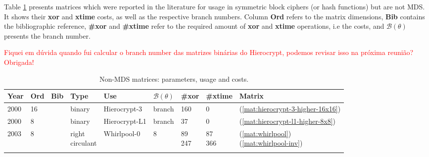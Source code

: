 Table \ref{tbl:non-mds-list} presents matrices which were reported in the literature for usage in symmetric block ciphers (or hash functions) but are not MDS. It shows their \textbf{xor} and \textbf{xtime} costs, as well as the respective branch numbers. Column \textbf{Ord} refers to the matrix dimensions, \textbf{Bib} contains the bibliographic reference, \textbf{\#xor} and \textbf{\#xtime} refer to the required amount of \textbf{xor} and \textbf{xtime} operations, i.e the costs, and \textbf{$\mathcal{B}(\theta)$} presents the branch number.

\textcolor{red}{Fiquei em dúvida quando fui calcular o branch number das matrizes binárias do Hierocrypt, podemos revisar isso na próxima reunião? Obrigada!}

\begin{footnotesize}
\begin{longtable}[c]{|l|l|l|l|l|l|l|l|l|}
\hline
\textbf{Year} & \textbf{Ord} & \textbf{Bib} & \textbf{Type} & \textbf{Use} & \textbf{$\mathcal{B}(\theta)$} & \textbf{\#xor} & \textbf{\#xtime} & \textbf{Matrix} \\ \hline
\endfirsthead
\endhead

2000 & 16 & \cite{Hierocrypt2000} & binary & Hierocrypt-3 & branch & 160 & 0 & (\ref{mat:hierocrypt-3-higher-16x16}) \\ \hline
2000 & 8 & \cite{Hierocrypt-L1-2000} & binary & Hierocrypt-L1 & branch & 37 & 0 & (\ref{mat:hierocrypt-l1-higher-8x8}) \\ \hline
2003 & 8 & \cite{Whirlpool2003} & \shortstack{right \\ circulant} & Whirlpool-0 & 8 & \shortstack{89\\247} & \shortstack{87\\366} & \shortstack{(\ref{mat:whirlpool})\\(\ref{mat:whirlpool-inv})} \\ \hline

\caption{Non-MDS matrices: parameters, usage and costs.}\label{tbl:non-mds-list}
\end{longtable}
\end{footnotesize}
